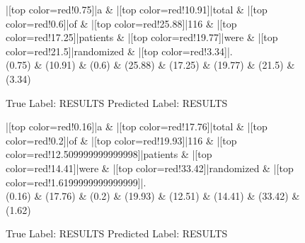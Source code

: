 \documentclass[a4paper, landscape]{article}
\begin{document}
\begin{figure}
\begin{center}
\begin{dependency}
\begin{deptext}
|[top color=red!0.75]|a \& |[top color=red!10.91]|total \& |[top color=red!0.6]|of \& |[top color=red!25.88]|116 \& |[top color=red!17.25]|patients \& |[top color=red!19.77]|were \& |[top color=red!21.5]|randomized \& |[top color=red!3.34]|.\\
(0.75) \& (10.91) \& (0.6) \& (25.88) \& (17.25) \& (19.77) \& (21.5) \& (3.34)\\
\end{deptext}
\end{dependency}
\end{center}
\caption{True Label: RESULTS Predicted Label: RESULTS}
\end{figure}
\clearpage
\begin{figure}
\begin{center}
\begin{dependency}
\begin{deptext}
|[top color=red!0.16]|a \& |[top color=red!17.76]|total \& |[top color=red!0.2]|of \& |[top color=red!19.93]|116 \& |[top color=red!12.509999999999998]|patients \& |[top color=red!14.41]|were \& |[top color=red!33.42]|randomized \& |[top color=red!1.6199999999999999]|.\\
(0.16) \& (17.76) \& (0.2) \& (19.93) \& (12.51) \& (14.41) \& (33.42) \& (1.62)\\
\end{deptext}
\end{dependency}
\end{center}
\caption{True Label: RESULTS Predicted Label: RESULTS}
\end{figure}
\clearpage
\end{document}

